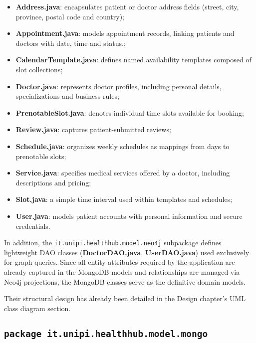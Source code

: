 \begin{itemize}
	\item \textbf{Address.java}: encapsulates patient or doctor address fields (street, city, province, postal code and country);
	\item \textbf{Appointment.java}: models appointment records, linking patients and doctors with date, time and status.;
	\item \textbf{CalendarTemplate.java}: defines named availability templates composed of slot collections;
	\item \textbf{Doctor.java}: represents doctor profiles, including personal details, specializations and business rules;
	\item \textbf{PrenotableSlot.java}: denotes individual time slots available for booking;
	\item \textbf{Review.java}: captures patient‑submitted reviews;
	\item \textbf{Schedule.java}: organizes weekly schedules as mappings from days to prenotable slots;
	\item \textbf{Service.java}: specifies medical services offered by a doctor, including descriptions and pricing;
	\item \textbf{Slot.java}: a simple time interval used within templates and schedules;
	\item \textbf{User.java}: models patient accounts with personal information and secure credentials.
\end{itemize}

In addition, the \texttt{it.unipi.healthhub.model.neo4j} subpackage defines lightweight DAO classes (\textbf{DoctorDAO.java}, \textbf{UserDAO.java}) used exclusively for graph queries. Since all entity attributes required by the application are already captured in the MongoDB models and relationships are managed via Neo4j projections, the MongoDB classes serve as the definitive domain models.

Their structural design has already been detailed in the Design chapter’s UML class diagram section.

\subsection{\texttt{package it.unipi.healthhub.model.mongo}}
